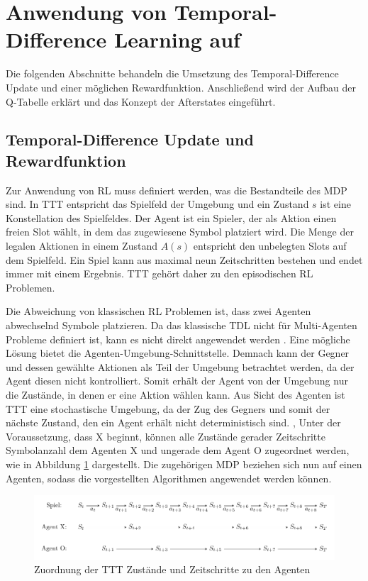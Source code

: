 \section{Anwendung von Temporal-Difference Learning auf \ttt}
\label{sec:TDL_TTT}
Die folgenden Abschnitte behandeln die Umsetzung des Temporal-Difference Update und einer möglichen Rewardfunktion. 
Anschließend wird der Aufbau der Q-Tabelle erklärt und das Konzept der Afterstates eingeführt.

\subsection{Temporal-Difference Update und Rewardfunktion}

Zur Anwendung von \acl{RL} muss definiert werden, was die Bestandteile des \ac{MDP} sind. 
In \acl{TTT} entspricht das Spielfeld der Umgebung und ein Zustand $s$ ist eine Konstellation des Spielfeldes. 
Der Agent ist ein Spieler, der als Aktion einen freien Slot wählt, in dem das zugewiesene Symbol platziert wird. 
Die Menge der legalen Aktionen in einem Zustand $A(s)$ entspricht den unbelegten Slots auf dem Spielfeld. 
Ein Spiel kann aus maximal neun Zeitschritten bestehen und endet immer mit einem Ergebnis. 
\acs{TTT} gehört daher zu den episodischen \ac{RL} Problemen.

Die Abweichung von klassischen \ac{RL} Problemen ist, dass zwei Agenten abwechselnd Symbole platzieren. Da das klassische \ac{TDL} nicht für Multi-Agenten Probleme definiert ist, kann es nicht direkt angewendet werden \cite[S. 2f. ]{vanderreeReinforcementLearningGame2013}. 
Eine mögliche Lösung bietet die Agenten-Umgebung-Schnittstelle. 
Demnach kann der Gegner und dessen gewählte Aktionen als Teil der Umgebung betrachtet werden, da der Agent diesen nicht kontrolliert. 
Somit erhält der Agent von der Umgebung nur die Zustände, in denen er eine Aktion wählen kann.
Aus Sicht des Agenten ist \acs{TTT} eine stochastische Umgebung, da der Zug des Gegners und somit der nächste Zustand, den ein Agent erhält nicht deterministisch sind. \cite[S. 2f]{vanderreeReinforcementLearningGame2013}, \cite{soemersd.GameAiHow} 
Unter der Voraussetzung, dass X beginnt, können alle Zustände gerader Zeitschritte \bzw Symbolanzahl dem Agenten X und ungerade dem Agent O zugeordnet werden, wie in Abbildung \cref{fig:ttt_state_to_agent} dargestellt.
Die zugehörigen \ac{MDP} beziehen sich nun auf einen Agenten, sodass die vorgestellten Algorithmen angewendet werden können.

\begin{figure}
    \centering
    \includegraphics[width=\linewidth]{04_Artefakte/01_Abbildungen/ttt_state_to_agent.pdf}
    \caption{Zuordnung der \acs{TTT} Zustände und Zeitschritte zu den Agenten }
    \label{fig:ttt_state_to_agent}
\end{figure}

